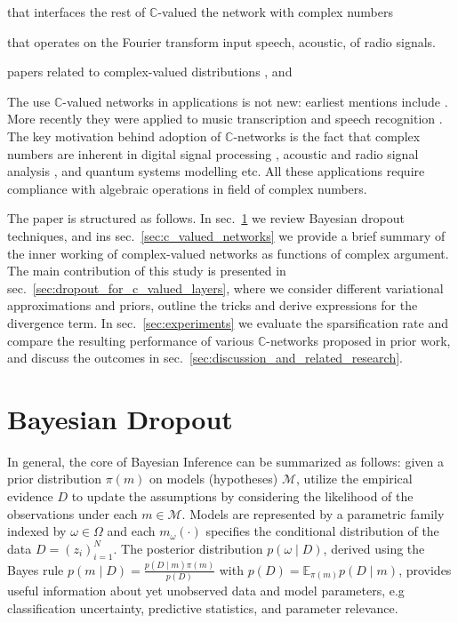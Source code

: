 \documentclass[a4paper,10pt]{article}
\newcommand{\cplx}{\mathbb{C}}
\begin{document}
that interfaces the rest of
$\cplx$-valued
the network with complex numbers


that operates on the Fourier transform input speech, acoustic, of radio signals.


papers related to complex-valued distributions \cite{pav_moments_2015,taubock_complex-valued_2012},
and \cite{karseras_caution:_2014}

The use $\cplx$-valued networks in applications is not new: earliest mentions include
\cite{citation_needed}. More recently they were applied to music transcription and speech
recognition \cite{trabelsi_deep_2017,yang_complex_2019}. The key motivation behind adoption
of $\cplx$-networks is the fact that complex numbers are inherent in digital signal processing
\cite{citation_needed}, acoustic and radio signal analysis \cite{citation_needed}, and
quantum systems modelling \cite{citation_needed} etc. All these applications require
compliance with algebraic operations in field of complex numbers.


The paper is structured as follows. In sec.~\ref{sec:bayesian_dropout} we review Bayesian
dropout techniques, and ins sec.~\ref{sec:c_valued_networks} we provide a brief summary of
the inner working of complex-valued networks as functions of complex argument. The main
contribution of this study is presented in sec.~\ref{sec:dropout_for_c_valued_layers},
where we consider different variational approximations and priors, outline the tricks
and derive expressions for the divergence term. In sec.~\ref{sec:experiments} we evaluate
the sparsification rate and compare the resulting performance of various $\cplx$-networks
proposed in prior work, and discuss the outcomes in sec.~\ref{sec:discussion_and_related_research}.



\section{Bayesian Dropout} %
\label{sec:bayesian_dropout}

In general, the core of Bayesian Inference can be summarized as follows: given a prior
distribution $\pi(m)$ on models (hypotheses) $\mathcal{M}$, utilize the empirical evidence
$D$ to update the assumptions by considering the likelihood of the observations under each
$m \in \mathcal{M}$. Models are represented by a parametric family indexed by $\omega \in
\Omega$ and each $m_\omega(\cdot)$ specifies the conditional distribution of the data $
  D = (z_i)_{i=1}^N
$. The posterior distribution $p(\omega \mid D)$, derived using the Bayes rule $
  p(m \mid D) = \tfrac{p(D \mid m) \pi(m)}{p(D)}
$ with $
  p(D) = \mathbb{E}_{\pi(m)} p(D \mid m)
$, provides useful information about yet unobserved data and model parameters, e.g
classification uncertainty, predictive statistics, and parameter relevance.
\end{document}

